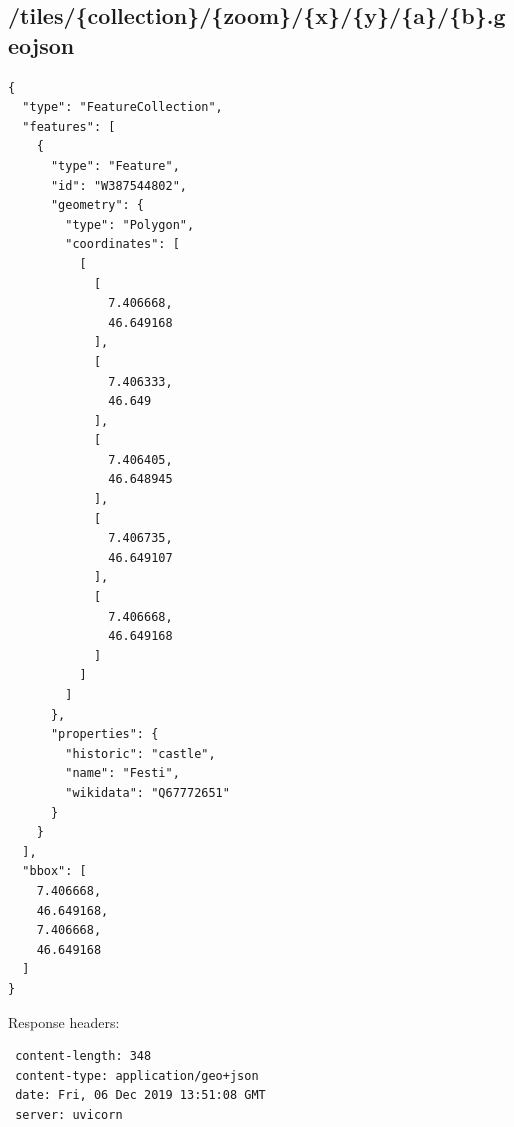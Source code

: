 \subsection{/tiles/\{collection\}/\{zoom\}/\{x\}/\{y\}/\{a\}/\{b\}.geojson}
\begin{verbatim}
{
  "type": "FeatureCollection",
  "features": [
    {
      "type": "Feature",
      "id": "W387544802",
      "geometry": {
        "type": "Polygon",
        "coordinates": [
          [
            [
              7.406668,
              46.649168
            ],
            [
              7.406333,
              46.649
            ],
            [
              7.406405,
              46.648945
            ],
            [
              7.406735,
              46.649107
            ],
            [
              7.406668,
              46.649168
            ]
          ]
        ]
      },
      "properties": {
        "historic": "castle",
        "name": "Festi",
        "wikidata": "Q67772651"
      }
    }
  ],
  "bbox": [
    7.406668,
    46.649168,
    7.406668,
    46.649168
  ]
}
\end{verbatim}
Response headers:
\begin{verbatim}
 content-length: 348 
 content-type: application/geo+json 
 date: Fri, 06 Dec 2019 13:51:08 GMT 
 server: uvicorn 
\end{verbatim}
	